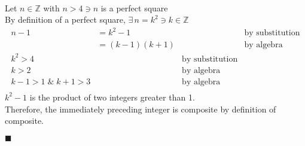 \documentclass[12pt]{article}
\newcommand{\Z}{\mathbb{Z}}
\renewcommand{\qed}{\hfill$\blacksquare$}
\renewenvironment{proof}{\begin{addmargin}[1em]{0em}\begin{newproof}}{\end{newproof}\end{addmargin}\qed}
\begin{document}
                            \begin{proof}
                              ~\\
                              Let $n \in \Z$ with $n > 4 \ni n$ is a perfect square \\
                              By definition of a perfect square, $\exists \, n = k^{2} \ni k \in \Z$
                              \begin{align*}
                                n - 1 &= k^{2} - 1 && \text{by substitution} \\
                                &= (k-1)(k+1) && \text{by algebra} \\
                                k^2>4 && \text{by substitution} \\
                                k>2 && \text{by algebra}\\
                                k - 1 > 1 \; \& \; k+1 > 3 && \text{by algebra} \\ 
                              \end{align*}
                              $k^{2}-1$ is the product of two integers greater than 1. \\
                              Therefore, the immediately preceding integer is composite by definition of composite.
                            \end{proof}

                            \pagebreak
\end{document}
